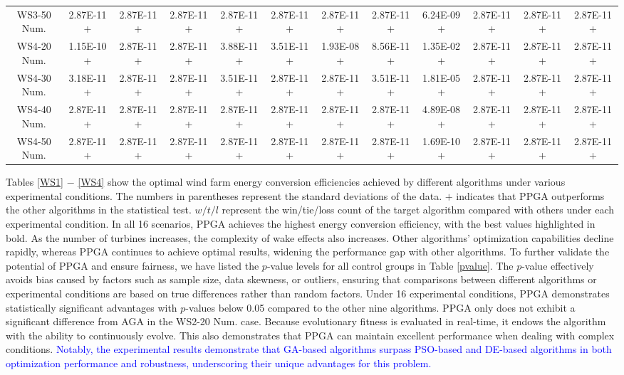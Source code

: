 \documentclass[journal,twoside]{IEEEtran}
\begin{document}
\begin{table}[htbp!]
{\begin{tabular}{cccccccccccc}
			WS3-50 Num.	 &	2.87E-11 +	 &	2.87E-11 +	 &	2.87E-11 +	 &	2.87E-11 +	 &	2.87E-11 +	 &	2.87E-11 +	&	2.87E-11 + & 6.24E-09 + & 2.87E-11 +& 2.87E-11 +& 2.87E-11 +	\\	
			WS4-20 Num.	 &	1.15E-10 +	 &	2.87E-11 +	 &	2.87E-11 +	 &	3.88E-11 +	 &	3.51E-11 +	 &	1.93E-08 +	&	8.56E-11 + & 1.35E-02 + & 2.87E-11 + & 2.87E-11 +& 2.87E-11 +\\	
			WS4-30 Num.	 &	3.18E-11 +	 &	2.87E-11 +	 &	2.87E-11 +	 &	3.51E-11 +	 &	2.87E-11 +	 &	2.87E-11 +	&	3.51E-11 + & 1.81E-05 + & 2.87E-11 +& 2.87E-11 +& 2.87E-11 +	\\	
			WS4-40 Num.	 &	2.87E-11 +	 &	2.87E-11 +	 &	2.87E-11 +	 &	2.87E-11 +	 &	2.87E-11 +	 &	2.87E-11 +	&	2.87E-11 + & 4.89E-08 + & 2.87E-11 +& 2.87E-11 +& 2.87E-11 +	\\	
			WS4-50 Num.	 &	2.87E-11 +	 &	2.87E-11 +	 &	2.87E-11 +	 &	2.87E-11 +	 &	2.87E-11 +	 &	2.87E-11 +	&	2.87E-11 + & 1.69E-10 + & 2.87E-11 +& 2.87E-11 +& 2.87E-11 +	\\	 \cline{1-12}																			
	\end{tabular}}
\end{table}
Tables \ref{WS1} $-$ \ref{WS4} show the optimal wind farm energy conversion efficiencies achieved by different algorithms under various experimental conditions. The numbers in parentheses represent the standard deviations of the data. $+$ indicates that PPGA outperforms the other algorithms in the statistical test. $w/t/l$ represent the win/tie/loss count of the target algorithm compared with others under each experimental condition. In all 16 scenarios, PPGA achieves the highest energy conversion efficiency, with the best values highlighted in bold. As the number of turbines increases, the complexity of wake effects also increases. Other algorithms' optimization capabilities decline rapidly, whereas PPGA continues to achieve optimal results, widening the performance gap with other algorithms. To further validate the potential of PPGA and ensure fairness, we have listed the $p$-value levels for all control groups in Table \ref{pvalue}. The $p$-value effectively avoids bias caused by factors such as sample size, data skewness, or outliers, ensuring that comparisons between different algorithms or experimental conditions are based on true differences rather than random factors. Under 16 experimental conditions, PPGA demonstrates statistically significant advantages with $p$-values below 0.05 compared to the other nine algorithms. PPGA only does not exhibit a significant difference from AGA in the WS2-20 Num. case. Because evolutionary fitness is evaluated in real-time, it endows the algorithm with the ability to continuously evolve. This also demonstrates that PPGA can maintain excellent performance when dealing with complex conditions. \textcolor{blue}{Notably, the experimental results demonstrate that GA-based algorithms surpass PSO-based and DE-based algorithms in both optimization performance and robustness, underscoring their unique advantages for this problem.}
\end{document}
